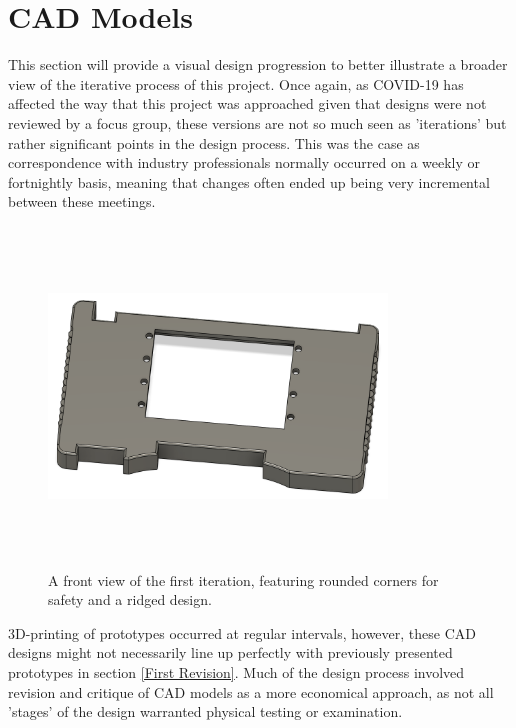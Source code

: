 
\section{CAD Models} \label{CAD Models}
This section will provide a visual design progression to better illustrate a broader view of the iterative process of this project.
Once again, as COVID-19 has affected the way that this project was approached given that designs were not reviewed by a focus group, these versions are not so much seen as 'iterations' but rather significant points in the design process.
This was the case as correspondence with industry professionals normally occurred on a weekly or fortnightly basis, meaning that changes often ended up being very incremental between these meetings.

\begin{figure} [h]
    \centering
    \includegraphics[width=9cm,height=9cm,keepaspectratio]{Figures/iteration1_top_front.png}
    \caption{A front view of the first iteration, featuring rounded corners for safety and a ridged design.}
    \label{fig:iteration1_t_f}
\end{figure}

3D-printing of prototypes occurred at regular intervals, however, these CAD designs might not necessarily line up perfectly with previously presented prototypes in section \ref{First Revision}.
Much of the design process involved revision and critique of CAD models as a more economical approach, as not all 'stages' of the design warranted physical testing or examination.

